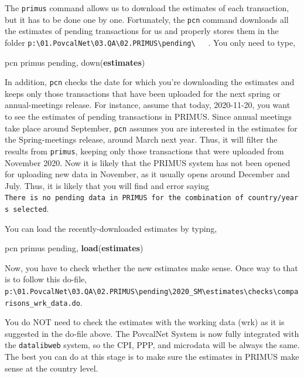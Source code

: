 \documentclass[
]{book}
\newenvironment{Shaded}{\begin{snugshade}}{\end{snugshade}}
\newcommand{\KeywordTok}[1]{\textcolor[rgb]{0.13,0.29,0.53}{\textbf{#1}}}
\newcommand{\NormalTok}[1]{#1}
\begin{document}
The \texttt{primus} command allows us to download the estimates of each transaction,
but it has to be done one by one. Fortunately, the \texttt{pcn} command downloads all
the estimates of pending transactions for us and properly stores them in the
folder \texttt{p:\textbackslash{}01.PovcalNet\textbackslash{}03.QA\textbackslash{}02.PRIMUS\textbackslash{}pending\textbackslash{}} 🎉
🎉 . You only need to type,

\begin{Shaded}
\begin{Highlighting}[]
\NormalTok{pcn primus pending, down(}\KeywordTok{estimates}\NormalTok{)}
\end{Highlighting}
\end{Shaded}

In addition, \texttt{pcn} checks the date for which you're downloading the estimates
and keeps only those transactions that have been uploaded for the next spring or
annual-meetings release. For instance, assume that today, 2020-11-20, you want
to see the estimates of pending transactions in PRIMUS. Since annual meetings
take place around September, \texttt{pcn} assumes you are interested in the estimates
for the Spring-meetings release, around March next year. Thus, it will filter
the results from \texttt{primus}, keeping only those transactions that were uploaded
from November 2020. Now it is likely that the PRIMUS system has not been opened
for uploading new data in November, as it usually opens around December and
July. Thus, it is likely that you will find and error saying
\texttt{There\ is\ no\ pending\ data\ in\ PRIMUS\ for\ the\ combination\ of\ country/years\ selected}.

You can load the recently-downloaded estimates by typing,

\begin{Shaded}
\begin{Highlighting}[]
\NormalTok{pcn primus pending, }\KeywordTok{load}\NormalTok{(}\KeywordTok{estimates}\NormalTok{)}
\end{Highlighting}
\end{Shaded}

Now, you have to check whether the new estimates make sense. Once way to that is
to follow this do-file,
\texttt{p:\textbackslash{}01.PovcalNet\textbackslash{}03.QA\textbackslash{}02.PRIMUS\textbackslash{}pending\textbackslash{}2020\_SM\textbackslash{}estimates\textbackslash{}checks\textbackslash{}comparisons\_wrk\_data.do}.

You do NOT need to check the estimates with the working data (wrk) as it is
suggested in the do-file above. The PovcalNet System is now fully integrated
with the \texttt{datalibweb} system, so the CPI, PPP, and microdata will be always the
same. The best you can do at this stage is to make sure the estimates in PRIMUS
make sense at the country level.
\end{document}
